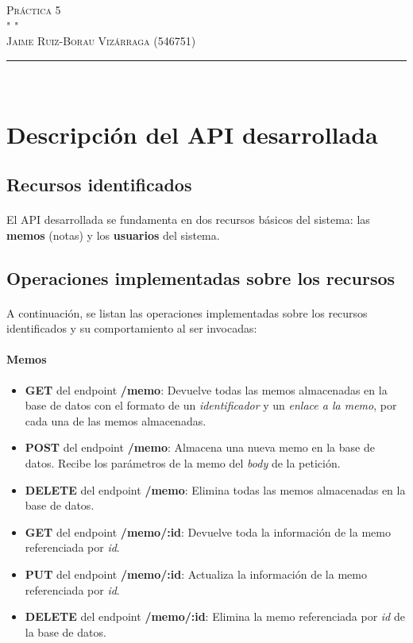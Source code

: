 \documentclass[a4paper]{article}
\newcommand{\HRule}{\rule{\linewidth}{0.35mm}} %
\begin{document}
\marginsize{3cm}{3cm}{2.5cm}{2.5cm} 

\begin{flushright}
	\textsc{\huge Práctica 5\\}
	\textsc{\tiny " "\\}
	\textsc{\large
		Jaime Ruiz-Borau Vizárraga (546751)\\
	}
	\HRule \\
\end{flushright}

\section{Descripción del API desarrollada}
\setcounter{page}{1}
\subsection{Recursos identificados}
\paragraph{}El API desarrollada se fundamenta en dos recursos básicos del sistema: las \textbf{memos} (notas) y los \textbf{usuarios} del sistema.
\subsection{Operaciones implementadas sobre los recursos}
\paragraph{}A continuación, se listan las operaciones implementadas sobre los recursos identificados y su comportamiento al ser invocadas:
\paragraph{Memos}
\begin{itemize}
	\item \textbf{GET} del endpoint \textbf{/memo}: Devuelve todas las memos almacenadas en la base de datos con el formato de un \textit{identificador} y un \textit{enlace a la memo}, por cada una de las memos almacenadas.
	\item \textbf{POST} del endpoint \textbf{/memo}:  
	Almacena una nueva memo en la base de datos. Recibe los parámetros de la memo del \textit{body} de la petición.
	\item \textbf{DELETE} del endpoint \textbf{/memo}: Elimina todas las memos almacenadas en la base de datos.
	\item \textbf{GET} del endpoint \textbf{/memo/:id}: Devuelve toda la información de la memo referenciada por \textit{id}.
	\item \textbf{PUT} del endpoint \textbf{/memo/:id}: Actualiza la información de la memo referenciada por \textit{id}.
	\item \textbf{DELETE} del endpoint \textbf{/memo/:id}: Elimina la memo referenciada por \textit{id} de la base de datos.
\end{itemize}
\end{document}
